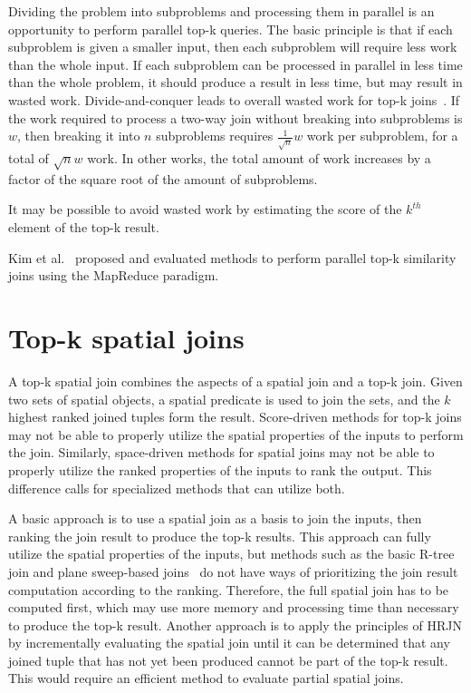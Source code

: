 Dividing the problem into subproblems and processing them in parallel is an opportunity to perform parallel top-k queries. The basic principle is that if each subproblem is given a smaller input, then each subproblem will require less work than the whole input. If each subproblem can be processed in parallel in less time than the whole problem, it should produce a result in less time, but may result in wasted work. Divide-and-conquer leads to overall wasted work for top-k joins~\cite{yu2010workload}. If the work required to process a two-way join without breaking into subproblems is \(w\), then breaking it into \(n\) subproblems requires \(\frac{1}{\sqrt{n}} w\) work per subproblem, for a total of \(\sqrt{n} w\) work. In other works, the total amount of work increases by a factor of the square root of the amount of subproblems.

It may be possible to avoid wasted work by estimating the score of the \(k^{th}\) element of the top-k result.

Kim et al.~\cite{kim2012parallel} proposed and evaluated methods to perform parallel top-k similarity joins using the MapReduce paradigm.

\section{Top-k spatial joins}

A top-k spatial join combines the aspects of a spatial join and a top-k join. Given two sets of spatial objects, a spatial predicate is used to join the sets, and the \(k\) highest ranked joined tuples form the result. Score-driven methods for top-k joins may not be able to properly utilize the spatial properties of the inputs to perform the join. Similarly, space-driven methods for spatial joins may not be able to properly utilize the ranked properties of the inputs to rank the output. This difference calls for specialized methods that can utilize both.

A basic approach is to use a spatial join as a basis to join the inputs, then ranking the join result to produce the top-k results. This approach can fully utilize the spatial properties of the inputs, but methods such as the basic R-tree join and plane sweep-based joins~\cite{arge1998scalable} do not have ways of prioritizing the join result computation according to the ranking. Therefore, the full spatial join has to be computed first, which may use more memory and processing time than necessary to produce the top-k result. Another approach is to apply the principles of HRJN by incrementally evaluating the spatial join until it can be determined that any joined tuple that has not yet been produced cannot be part of the top-k result. This would require an efficient method to evaluate partial spatial joins.


